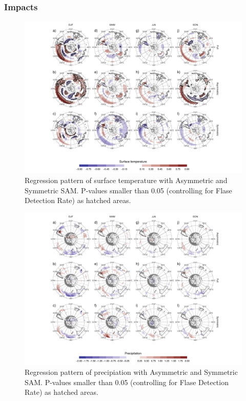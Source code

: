 \documentclass[]{ametsocV5}
\begin{document}
\subsubsection{Impacts}

\begin{figure}
\includegraphics{regr-air-season-1} \caption[Regression pattern of surface temperature with Asymmetric and Symmetric SAM]{Regression pattern of surface temperature with Asymmetric and Symmetric SAM. P-values smaller than 0.05 (controlling for Flase Detection Rate) as hatched areas.}\label{fig:regr-air-season}
\end{figure}

\begin{figure}
\includegraphics{pp-regr-global-1} \caption[Regression pattern of precipiation with Asymmetric and Symmetric SAM]{Regression pattern of precipiation with Asymmetric and Symmetric SAM. P-values smaller than 0.05 (controlling for Flase Detection Rate) as hatched areas.}\label{fig:pp-regr-global}
\end{figure}
\end{document}
